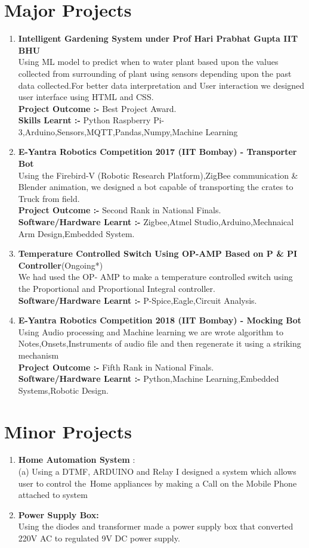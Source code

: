 \documentclass[12pt]{article}
\begin{document}
\section*{\textbf{Major Projects}}
\begin{enumerate}
\item {\textbf{Intelligent Gardening System under Prof Hari Prabhat Gupta IIT BHU }}\\ 
Using ML model to predict when to water plant based upon the values collected from surrounding of plant using sensors depending upon the past data collected.For better data interpretation and User interaction we designed user interface using HTML and CSS.\\
\textbf{Project Outcome :-} Best Project Award.\\
\textbf{Skills Learnt :-} Python Raspberry Pi-3,Arduino,Sensors,MQTT,Pandas,Numpy,Machine Learning 
\item {\textbf{E-Yantra Robotics Competition 2017 (IIT Bombay) - Transporter Bot}}\\ Using the Firebird-V (Robotic Research Platform),ZigBee communication \& Blender animation, we designed  a bot capable of transporting the crates to Truck from field.\\ 
\textbf{Project Outcome :-} Second Rank in National Finals.\\
\textbf{Software/Hardware Learnt :-} Zigbee,Atmel Studio,Arduino,Mechnaical Arm Design,Embedded System.
\item {\textbf{Temperature Controlled Switch Using OP-AMP Based on P \& PI Controller}(Ongoing*)}\\ 
We had used the OP- AMP to make a temperature controlled switch using the Proportional and Proportional Integral controller. 
\\ 
\textbf{Software/Hardware Learnt :-} P-Spice,Eagle,Circuit Analysis.
\item {{\textbf{E-Yantra Robotics Competition 2018 (IIT Bombay) - Mocking Bot}}}\\ 
 Using Audio processing and Machine learning we are wrote algorithm to Notes,Onsets,Instruments of audio file and then regenerate it using a striking mechanism
\\
\textbf{Project Outcome :-} Fifth Rank in National Finals.\\
\textbf{Software/Hardware Learnt :-} Python,Machine Learning,Embedded Systems,Robotic Design.
\end{enumerate}


\section*{\textbf{Minor Projects}}
\begin{enumerate}
  \item{\textbf{Home Automation System}} :\\(a) Using a DTMF, ARDUINO and Relay I designed a system
which allows user to control the\ Home appliances by making a Call on the Mobile
Phone attached to system
\item {\textbf{Power Supply Box:}}\\ Using the diodes and transformer made a power supply box that converted 220V AC to regulated 9V DC power supply.
\end{enumerate}
\end{document}
